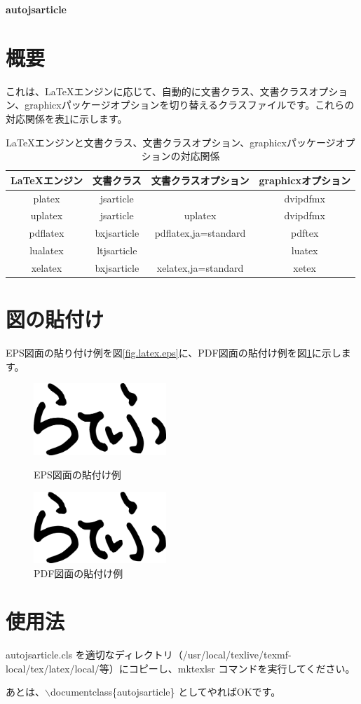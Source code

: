 \documentclass{autojsarticle}
\begin{document}
\begin{center}
	\huge\bfseries autojsarticle
\end{center}

\section{概要}

これは、\LaTeX エンジンに応じて、自動的に文書クラス、文書クラスオプション、graphicxパッケージオプションを切り替えるクラスファイルです。これらの対応関係を表\ref{tbl.correspondence}に示します。

\begin{table}[h]
	\centering
	\caption{\LaTeX エンジンと文書クラス、文書クラスオプション、graphicxパッケージオプションの対応関係}
	\label{tbl.correspondence}
	\begin{tabular}{|c|c|c|c|}
		\hline 
		\LaTeX エンジン & 文書クラス & 文書クラスオプション & graphicxオプション \\ 
		\hline\hline 
		platex & jsarticle & & dvipdfmx \\ 
		\hline 
		uplatex & jsarticle & uplatex & dvipdfmx \\ 
		\hline 
		pdflatex & bxjsarticle & pdflatex,ja=standard & pdftex \\ 
		\hline 
		lualatex & ltjsarticle &  & luatex \\ 
		\hline 
		xelatex & bxjsarticle & xelatex,ja=standard & xetex \\ 
		\hline 
	\end{tabular} 
\end{table}

\section{図の貼付け}

EPS図面の貼り付け例を図\ref{fig.latex.eps}に、PDF図面の貼付け例を図\ref{fig.latex.pdf}に示します。

\begin{figure}[h]
	\centering
	\includegraphics[width=5cm]{latex.eps}
	\caption{EPS図面の貼付け例}
	\label{fig.latex.eps}
	\bigskip
	\includegraphics[width=5cm]{latex.pdf}
	\caption{PDF図面の貼付け例}
	\label{fig.latex.pdf}
\end{figure}

\section{使用法}

autojsarticle.cls を適切なディレクトリ（\slash usr\slash local\slash  texlive\slash texmf-local\slash tex\slash latex\slash local\slash 等）にコピーし、mktexlsr コマンドを実行してください。

あとは、$\backslash$documentclass\{autojsarticle\} としてやればOKです。
\end{document}
